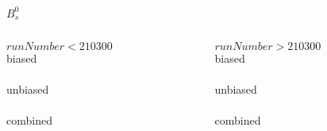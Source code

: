 \begin{frame}{$B_s^0$}
  
  \begin{columns}
  
    \begin{column}{0.45\textwidth}
    $runNumber<210300$\\[3mm]
    {biased} \\[2mm]
    \resizebox{\textwidth}{!}{}\\[5mm]
    {unbiased} \\[2mm]
    \resizebox{\textwidth}{!}{}\\[5mm]
    {combined} \\[2mm]
    \resizebox{\textwidth}{!}{}\\
    \end{column}
  
    \begin{column}{0.45\textwidth}
    $runNumber>210300$\\[3mm]
    {biased} \\[2mm]
    \resizebox{\textwidth}{!}{}\\[5mm]
    {unbiased} \\[2mm]
    \resizebox{\textwidth}{!}{}\\[5mm]
    {combined} \\[2mm]
    \resizebox{\textwidth}{!}{}\\
    \end{column}
  
  \end{columns}

\end{frame}




%
%
%
% 
%
%
%
%
%
%
%
% 
%



